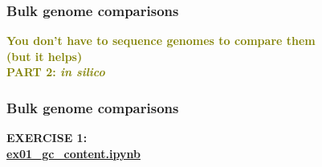 
%
\begin{frame}
  \frametitle{Bulk genome comparisons}
  \Large{
    \textcolor{olive}{
      \textbf{
      You don't have to sequence genomes to compare them \\
      (but it helps) \\
      PART 2: \textit{in silico}
      }
    }
  }
\end{frame}

%
\begin{frame}
  \frametitle{Bulk genome comparisons}
  \Large{
    \textcolor{hutton_blue}{
      \textbf{
      EXERCISE 1: \\
      \url{ex01_gc_content.ipynb}
      }
    }
  }
\end{frame}